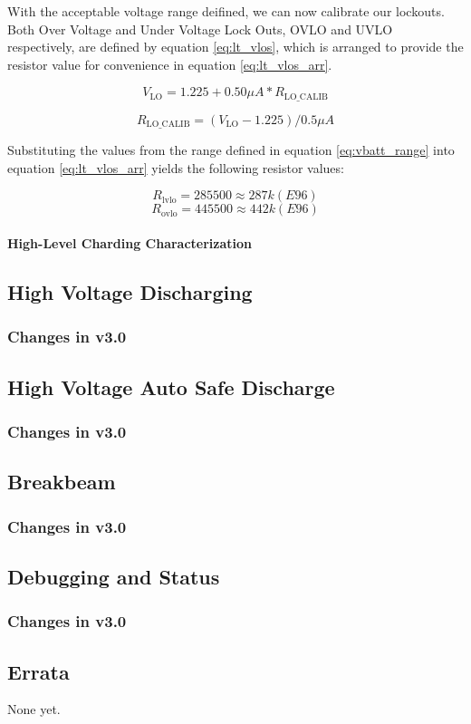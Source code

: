 \documentclass[12pt, letterpaper]{article}
\begin{document}
With the acceptable voltage range deifined, we can now calibrate our lockouts. Both Over Voltage and Under Voltage Lock Outs, OVLO and UVLO respectively, are defined by equation \ref{eq:lt_vlos}, which is arranged to provide the resistor value for convenience in equation \ref{eq:lt_vlos_arr}. 

\begin{equation} \label{eq:lt_vlos}
V_\mathrm{LO} = 1.225 + 0.50 \mu A * R_\mathrm{LO\_CALIB}
\end{equation}

\begin{equation} \label{eq:lt_vlos_arr}
R_\mathrm{LO\_CALIB} = (V_\mathrm{LO} - 1.225) / 0.5 \mu A
\end{equation}

Substituting the values from the range defined in equation \ref{eq:vbatt_range} into equation \ref{eq:lt_vlos_arr} yields the following resistor values:

$$ R_\mathrm{lvlo} = 285500 \approx 287k (E96) $$
$$ R_\mathrm{ovlo} = 445500 \approx 442k (E96) $$

\paragraph{High-Level Charding Characterization}



\subsection{High Voltage Discharging}

\subsubsection{Changes in v3.0}

\subsection{High Voltage Auto Safe Discharge}

\subsubsection{Changes in v3.0}

\subsection{Breakbeam}

\subsubsection{Changes in v3.0}

\subsection{Debugging and Status}

\subsubsection{Changes in v3.0}

\subsection{Errata}
None yet.
\end{document}
